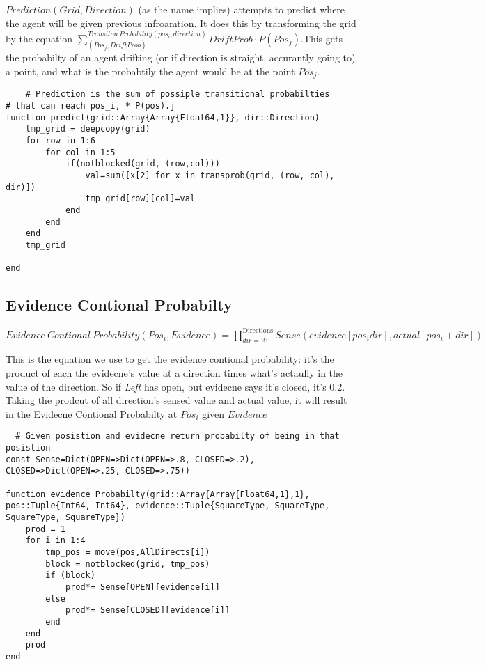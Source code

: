 \documentclass[11pt]{article}
\begin{document}
\(Prediction(Grid, Direction)\) (as the name implies) attempts to predict where the agent will be given previous infroamtion. It does this by transforming the grid by the equation  \(\sum^{Transiton\ Probability(pos_i, direction)}_{(Pos_j, DriftProb)} DriftProb \cdot P(Pos_j)\).This gets the probabilty of an agent drifting (or if direction is straight, accurantly going to) a point, and what is the probabtily the agent would be at the point \(Pos_j\).

\begin{verbatim}
    # Prediction is the sum of possiple transitional probabilties
# that can reach pos_i, * P(pos).j
function predict(grid::Array{Array{Float64,1}}, dir::Direction)
	tmp_grid = deepcopy(grid)
	for row in 1:6
		for col in 1:5
			if(notblocked(grid, (row,col)))
				val=sum([x[2] for x in transprob(grid, (row, col), dir)])
				tmp_grid[row][col]=val
			end
		end
	end
	tmp_grid

end

\end{verbatim}

\subsection{Evidence Contional Probabilty}
\label{sec:org701dd3a}
\begin{center}
\(Evidence\ Contional\ Probability(Pos_i, Evidence) =  \prod^{\text{Directions} }_{dir=W} Sense(evidence[pos_i dir], actual[pos_i+dir])\)
\end{center}

This is the equation we use to get the evidence contional probability: it's the product of each the evidecne's value at a direction times what's actaully in the value of the direction. So if \emph{Left} has open, but evidecne says it's closed, it's 0.2. Taking the prodcut of all direction's sensed value and actual value, it will result in the Evidecne Contional Probabilty at \(Pos_i\) given \(Evidence\)

\begin{verbatim}
  # Given posistion and evidecne return probabilty of being in that posistion
const Sense=Dict(OPEN=>Dict(OPEN=>.8, CLOSED=>.2), CLOSED=>Dict(OPEN=>.25, CLOSED=>.75))

function evidence_Probabilty(grid::Array{Array{Float64,1},1}, pos::Tuple{Int64, Int64}, evidence::Tuple{SquareType, SquareType, SquareType, SquareType})
	prod = 1
	for i in 1:4
		tmp_pos = move(pos,AllDirects[i])
		block = notblocked(grid, tmp_pos)
		if (block)
			prod*= Sense[OPEN][evidence[i]]
		else
			prod*= Sense[CLOSED][evidence[i]]
		end
	end
	prod 
end
\end{verbatim}
\end{document}

